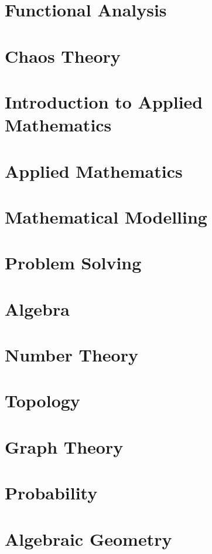 \documentclass[oneside]{book}
\theoremstyle{definition}
\begin{document}
\chapter{Functional Analysis}

\chapter{Chaos Theory}

\chapter{Introduction to Applied Mathematics}

\chapter{Applied Mathematics}

\chapter{Mathematical Modelling}

\chapter{Problem Solving}

\chapter{Algebra}

\chapter{Number Theory}

\chapter{Topology}

\chapter{Graph Theory}

\chapter{Probability}

\chapter{Algebraic Geometry}
\end{document}
